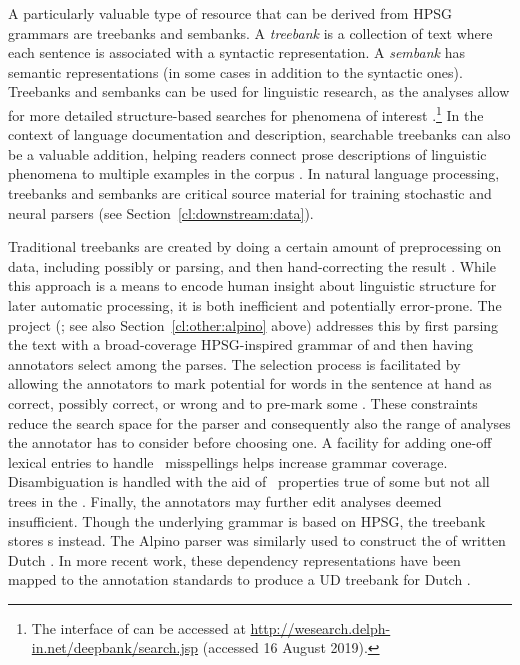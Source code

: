 \documentclass[output=paper,nonflat]{langsci/langscibook}
\begin{document}
A particularly valuable type of resource that can be derived from HPSG
grammars are treebanks and sembanks. A \textit{treebank} is a collection of
text where each sentence is associated with a syntactic
representation. A \textit{sembank} has semantic representations (in some cases
in addition to the syntactic ones). Treebanks and sembanks can be used
for linguistic research, as the analyses allow for more detailed
structure-based searches for phenomena of interest \citep{Rohde:05,Gho:Bir:10,Kou:Oep:14}.\footnote{The  interface of \citet{Kou:Oep:14} can be accessed at \url{http://wesearch.delph-in.net/deepbank/search.jsp} (accessed 16 August 2019).}
In the context of language documentation and description, searchable
treebanks can also be a valuable addition, helping readers connect
prose descriptions of linguistic phenomena to multiple examples in the
corpus \citep{Ben:Gho:Bal:Dri:12}. In natural language processing,
treebanks and sembanks are critical source material for training
stochastic and neural parsers (see Section~\ref{cl:downstream:data}).

Traditional treebanks are created by doing a certain amount of
preprocessing on data, including possibly  or  parsing, and
then hand-correcting the result \citep{Mar:San:Mar:93,Ban:Bon:Cai:13}.
While this approach is a means to encode human insight about
linguistic structure for later automatic processing, it is both
inefficient and potentially error-prone. The  project
(\citealt{vanderbeek2002alpino}; see also Section~\ref{cl:other:alpino} above) addresses this by first parsing the text
with a broad-coverage HPSG-inspired grammar of  and then having
annotators select among the parses. The selection process is
facilitated by allowing the annotators to mark potential  
for words in the sentence at hand as correct, possibly
correct, or wrong and to pre-mark some . These
constraints reduce the search space for the parser and consequently
also the range of analyses the annotator has to consider before
choosing one. A facility for adding one-off lexical entries to handle
\eg\ misspellings helps increase grammar coverage.  Disambiguation is
handled with the aid of \textit{} \ie\ properties true of
some but not all trees in the  \citep{Carter:97}. Finally,
the annotators may further edit analyses deemed insufficient. Though
the underlying grammar is based on HPSG, the treebank stores
s instead.  The Alpino parser was similarly
used to construct the  of written Dutch
\citep{van:bou:van:13}.  In more recent work, these dependency
representations have been mapped to the 
annotation standards \citep{Niv:Mar:Gin:16} to produce a UD treebank
for Dutch \citep{Bou:Van:17}.
\end{document}
